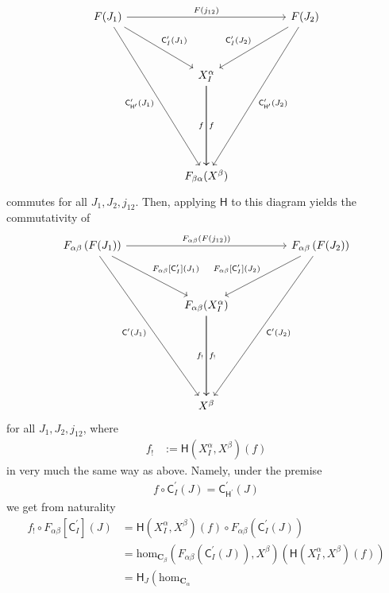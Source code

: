 \begin{prf}
\[\begin{tikzcd}[sep=huge]
  F(J_{1})
  \arrow{rr}{F(j_{12})}
  \arrow{dr}{\mathsf{C}_{I}^{\prime}(J_{1})}
  \arrow[swap]{dddr}{\mathsf{C}_{\mathsf{H}^{\prime}}^{\prime}(J_{1})}
  &
  &
  F(J_{2})
  \arrow{dddl}{\mathsf{C}_{\mathsf{H}^{\prime}}^{\prime}(J_{2})}
  \arrow[swap]{dl}{\mathsf{C}_{I}^{\prime}(J_{2})}
  \\
  &
  X_{I}^{\alpha}
  \arrow{dd}{f}
  \arrow[swap]{dd}{f}
  &
  \\
  \\
  &
  F_{\beta\alpha}(X^{\beta})
  &
\end{tikzcd}
\]
commutes for all $J_{1},J_{2},j_{12}$.
Then, applying $\mathsf{H}$ to this diagram yields the commutativity of
\[
\begin{tikzcd}[sep=huge]
  F_{\alpha\beta}
  \left(
    F(J_{1})
  \right)
  \arrow{rr}{F_{\alpha\beta}(F(j_{12}))}
  \arrow{dr}{F_{\alpha\beta}[\mathsf{C}_{I}^{\prime}](J_{1})}
  \arrow[swap]{dddr}{\mathsf{C}^{\prime}(J_{1})}
  &
  &
  F_{\alpha\beta}
  \left(
    F(J_{2})
  \right)
  \arrow{dddl}{\mathsf{C}^{\prime}(J_{2})}
  \arrow[swap]{dl}{F_{\alpha\beta}[\mathsf{C}_{I}^{\prime}](J_{2})}
  \\
  &
  F_{\alpha\beta}(X_{I}^{\alpha})
  \arrow{dd}{f_{!}}
  \arrow[swap]{dd}{f_{!}}
  &
  \\
  \\
  &
  X^{\beta}
  &
\end{tikzcd}
\]
for all $J_{1},J_{2},j_{12}$, where
\begin{align*}
  f_{!}
  &:=
  \mathsf{H}
  \left(
    X_{I}^{\alpha},
    X^{\beta}
  \right)
  (f)
\end{align*}
in very much the same way as above.
Namely, under the premise
\begin{align*}
  f
  \circ
  \mathsf{C}_{I}^{\prime}(J)
  =
  \mathsf{C}_{\mathsf{H}^{\prime}}^{\prime}(J)
\end{align*}
we get from naturality
\begin{align*}
  f_{!}
  \circ
  F_{\alpha\beta}[\mathsf{C}_{I}^{\prime}](J)
  &=
  \mathsf{H}
  \left(
    X_{I}^{\alpha},
    X^{\beta}
  \right)
  (f)
  \circ
  F_{\alpha\beta}
  \left(
    \mathsf{C}_{I}^{\prime}(J)
  \right)
  \\
  &=
  \mathrm{hom}_{\mathbf{C}_{\beta}}
  \left(
    F_{\alpha\beta}
    \left(
      \mathsf{C}_{I}^{\prime}(J)
    \right),
    X^{\beta}
  \right)
  \left(
    \mathsf{H}
    \left(
      X_{I}^{\alpha},
      X^{\beta}
    \right)(f)
  \right)
  \\
  &=
  \mathsf{H}_{J}
  \left(
    \mathrm{hom}_{\mathbf{C}_{\alpha}}

\end{align*}
\end{prf}
